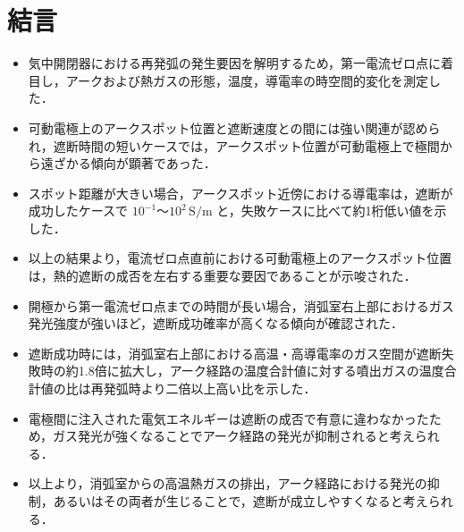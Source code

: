 \documentclass[dvipdfmx,report,uplatex]{jsbook}
\numberwithin{equation}{section}
\numberwithin{figure}{section}
\numberwithin{table}{section}
\begin{document}
\chapter{結言}
\begin{itemize}
 \item 気中開閉器における再発弧の発生要因を解明するため，第一電流ゼロ点に着目し，アークおよび熱ガスの形態，温度，導電率の時空間的変化を測定した．
  \vspace{\baselineskip}
 \item 可動電極上のアークスポット位置と遮断速度との間には強い関連が認められ，遮断時間の短いケースでは，アークスポット位置が可動電極上で極間から遠ざかる傾向が顕著であった．
  \vspace{\baselineskip}
 \item スポット距離が大きい場合，アークスポット近傍における導電率は，遮断が成功したケースで \(10^{-1}\)～\(10^{2}\,\mathrm{S/m}\) と，失敗ケースに比べて約1桁低い値を示した．
  \vspace{\baselineskip}
 \item 以上の結果より，電流ゼロ点直前における可動電極上のアークスポット位置は，熱的遮断の成否を左右する重要な要因であることが示唆された．
  \vspace{\baselineskip}
 \item 開極から第一電流ゼロ点までの時間が長い場合，消弧室右上部におけるガス発光強度が強いほど，遮断成功確率が高くなる傾向が確認された．
  \vspace{\baselineskip}
 \item 遮断成功時には，消弧室右上部における高温・高導電率のガス空間が遮断失敗時の約1.8倍に拡大し，アーク経路の温度合計値に対する噴出ガスの温度合計値の比は再発弧時より二倍以上高い比を示した．
  \vspace{\baselineskip}
 \item 電極間に注入された電気エネルギーは遮断の成否で有意に違わなかったため，ガス発光が強くなることでアーク経路の発光が抑制されると考えられる．
\vspace{\baselineskip}
 \item 以上より，消弧室からの高温熱ガスの排出，アーク経路における発光の抑制，あるいはその両者が生じることで，遮断が成立しやすくなると考えられる．
\end{itemize}

\clearpage

\end{document}
